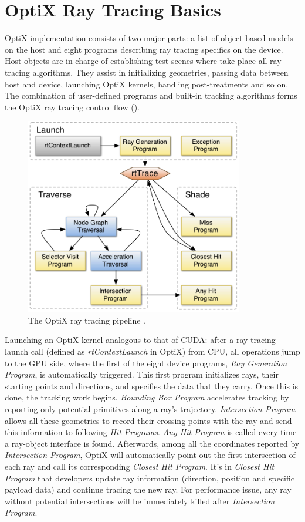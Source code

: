 \section{OptiX Ray Tracing Basics}
\label{basics}
OptiX implementation consists of two major parts: a list of object-based models on the host and eight programs describing ray tracing specifics on the device. Host objects are in charge of establishing test scenes where take place all ray tracing algorithms. They assist in initializing geometries, passing data between host and device, launching OptiX kernels, handling post-treatments and so on. The combination of user-defined programs and built-in tracking algorithms forms the OptiX ray tracing control flow ().
\begin{figure}[htbp]
	\centering
		\includegraphics[width=9.5cm]{Figures/optixpipeline.png}
	\caption[The OptiX ray tracing pipeline]{The OptiX ray tracing pipeline \citep{Parker10OptiX}.}
	\label{fig:pipeline}
\end{figure}

Launching an OptiX kernel analogous to that of CUDA: after a ray tracing launch call (defined as \textit{rtContextLaunch} in OptiX) from CPU, all operations jump to the GPU side, where the first of the eight device programs, \textit{Ray Generation Program}, is automatically triggered. This first program initializes rays, their starting points and directions, and specifies the data that they carry. Once this is done, the tracking work begins. \textit{Bounding Box Program} accelerates tracking by reporting only potential primitives along a ray's trajectory. \textit{Intersection Program} allows all these geometries to record their crossing points with the ray and send this information to following \textit{Hit Programs}. \textit{Any Hit Program} is called every time a ray-object interface is found. Afterwards, among all the coordinates reported by \textit{Intersection Program}, OptiX will automatically point out the first intersection of each ray and call its corresponding \textit{Closest Hit Program}. It's in \textit{Closest Hit Program} that developers update ray information (direction, position and specific payload data) and continue tracing the new ray. For performance issue, any ray without potential intersections will be immediately killed after \textit{Intersection Program}. 

